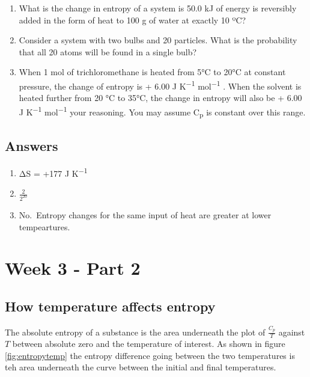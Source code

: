 \documentclass[
]{book}
\begin{document}
\begin{enumerate}
\def\labelenumi{\arabic{enumi}.}
\item
  What is the change in entropy of a system is 50.0 kJ of energy is reversibly added in the form of heat to 100 g of water at exactly 10 ºC?
\item
  Consider a system with two bulbs and 20 particles. What is the probability that all 20 atoms will be found in a single bulb?
\item
  When 1 mol of trichloromethane is heated from 5°C to 20°C at constant pressure, the
  change of entropy is + 6.00 J K\textsuperscript{−1} mol\textsuperscript{−1} . When the solvent is heated further from 20 °C to 35°C, the change in entropy will also be + 6.00 J K\textsuperscript{−1} mol\textsuperscript{−1} your reasoning. You may assume C\textsubscript{p} is constant over this range.
\end{enumerate}

\hypertarget{sec:w3p1ans}{%
\section{Answers}\label{sec:w3p1ans}}

\begin{enumerate}
\def\labelenumi{\arabic{enumi}.}
\item
  ΔS = +177 J K\textsuperscript{−1}
\item
  \(\frac{2}{2^{20}}\)
\item
  No.~Entropy changes for the same input of heat are greater at lower tempeartures.
\end{enumerate}

\hypertarget{ch:Part6}{%
\chapter{Week 3 - Part 2}\label{ch:Part6}}

\hypertarget{how-temperature-affects-entropy}{%
\section{How temperature affects entropy}\label{how-temperature-affects-entropy}}

The absolute entropy of a substance is the area underneath the plot of \(\frac{C_p}{T}\) against \(T\) between absolute zero and the temperature of interest. As shown in figure \ref{fig:entropytemp} the entropy difference going between the two temperatures is teh area underneath the curve between the initial and final temperatures.
\end{document}
